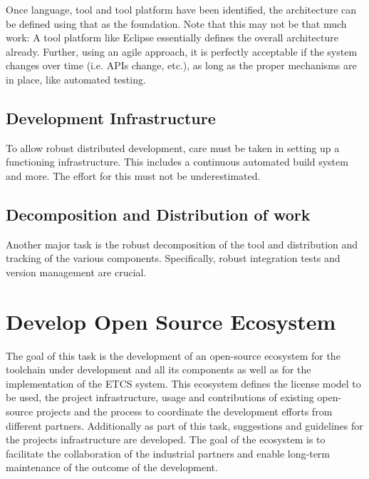 \documentclass[11pt, a4paper]{article}
\begin{document}
Once language, tool and tool platform have been identified, the architecture can be defined using that as the foundation. Note that this may not be that much work: A tool platform like Eclipse essentially defines the overall architecture already. Further, using an agile approach, it is perfectly acceptable if the system changes over time (i.e. APIs change, etc.), as long as the proper mechanisms are in place, like automated testing.

\subsection{Development Infrastructure}

To allow robust distributed development, care must be taken in setting up a functioning infrastructure. This includes a continuous automated build system and more. The effort for this must not be underestimated.

\subsection{Decomposition and Distribution of work}

Another major task is the robust decomposition of the tool and distribution and tracking of the various components. Specifically, robust integration tests and version management are crucial.

\section{Develop Open Source Ecosystem}
The goal of this task is the development of an open-source ecosystem for the toolchain under development and all its components as well as for the implementation of the ETCS system. This ecosystem defines the license model to be used, the project infrastructure, usage and contributions of existing open-source projects and the process to coordinate the development efforts from different partners. Additionally as part of this task, suggestions and guidelines for the projects infrastructure are developed. The goal of the ecosystem is to facilitate the collaboration of the industrial partners and enable long-term maintenance of the outcome of the development.
\end{document}
